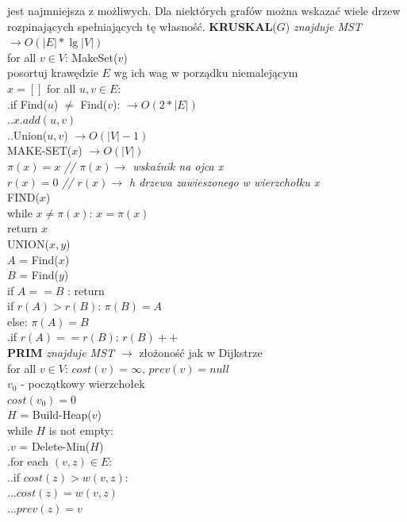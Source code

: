 \documentclass[8pt,a3paper]{article}
\begin{document}
\begin{multicols*}{3}
	 jest najmniejsza z możliwych. Dla niektórych grafów można wskazać wiele drzew rozpinających spełniających tę własność.
	 \textbf{KRUSKAL}($G$) \textit{znajduje MST}  $\to O(|E|*\lg|V|)$\\
	 for all $v \in V$: MakeSet($v$)\\
	 posortuj krawędzie $E$ wg ich wag w porządku niemalejącym\\
	 $x = []$ 
	 for all ${u,v} \in E$: \\
	 .\quad if Find($u$) $\neq$ Find($v$): {\color{BrickRed}$\to O(2*|E|)$}\\
	 .\quad .\quad $x.add(u,v)$ \\
	 .\quad .\quad Union($u,v$) {\color{BrickRed}$\to O(|V|-1)$}\\
	 MAKE-SET($x$) $\to O(|V|)$\\
	 $\pi(x) =x$ \textit{// $\pi(x) \to$ wskaźnik na ojca x} \\
	 $r(x)=0$ \textit{// $r(x) \to$ h drzewa zawieszonego w wierzchołku x}\\
	 FIND($x$) \\
	 while $x \neq \pi(x)$: $x=\pi(x)$ \\
	 return $x$ \\
	 UNION($x,y$) \\
	 $A$ = Find($x$) \\
	 $B$ = Find($y$)\\
	 if $A == B$ : return \\
	 if $r(A) > r(B)$: $\pi(B) =A$ \\
	 else: $\pi(A) = B$ \\
	 .\quad if $r(A) == r(B)$: $r(B)++$\\
	 \textbf{PRIM} \textit{znajduje MST} $\to$ złożoność jak w Dijkstrze \\
	 for all $v \in V$: $cost(v)=\infty$, \quad $prev(v)=null$ \\
	 $v_{0}$ - początkowy wierzchołek \\
	 $cost(v_{0}) =0$ \\
	 $H$ = Build-Heap($v$) \\
	 while $H$ is not empty:\\
	 .\quad $v$ = Delete-Min($H$) \\
	 .\quad for each $(v,z) \in E$:\\
	 .\quad .\quad if $cost(z) > w(v,z):$ \\
	 .\quad .\quad .\quad $cost(z) = w(v,z)$ \\
	 .\quad .\quad .\quad $prev(z) = v$ \\

\end{multicols*}
\end{document}
